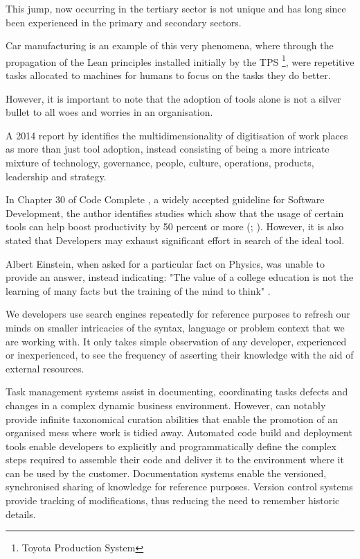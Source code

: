 This jump, now occurring in the tertiary sector is not unique and has long since been experienced in the primary and secondary sectors. 

Car manufacturing is an example of this very phenomena, where through the propagation of the Lean principles installed initially by the TPS \footnote{Toyota Production System}, were repetitive tasks allocated to machines for humans to focus on the tasks they do better.%

However, it is important to note that the adoption of tools alone is not a silver bullet to all woes and worries in an organisation. 

A 2014 report by \citeauthor{azhari2014digital} identifies the multidimensionality of digitisation of work places as more than just tool adoption, instead consisting of being a more intricate mixture of technology, governance, people, culture, operations, products, leadership and strategy.

In Chapter 30 of Code Complete \parencite{codeComplete}, a widely accepted guideline for Software Development, the author identifies studies which show that the usage of certain tools can help boost productivity by 50 percent or more (\cite{jones2000software}; \citeauthor{boehm2000software} \citeyear{boehm2000software}). However, it is also stated that Developers may exhaust significant effort in search of the ideal tool. 

Albert Einstein, when asked for a particular fact on Physics, was unable to provide an answer, instead indicating: "The value of a college education is not the learning of many facts but the training of the mind to think"  \parencite{einstein2011ultimate}.

We developers use search engines repeatedly for reference purposes to refresh our minds on smaller intricacies of the syntax, language or problem context that we are working with. It only takes simple observation of any developer, experienced or inexperienced, to see the frequency of asserting their knowledge with the aid of external resources.

Task management systems assist in documenting, coordinating tasks defects and changes in a complex dynamic business environment. However, can notably provide infinite taxonomical curation abilities that enable the promotion of an organised mess where work is tidied away. Automated code build and deployment tools enable developers to explicitly and programmatically define the complex steps required to assemble their code and deliver it to the environment where it can be used by the customer. Documentation systems enable the versioned, synchronised sharing of knowledge for reference purposes. Version control systems provide tracking of modifications, thus reducing the need to remember historic details.


